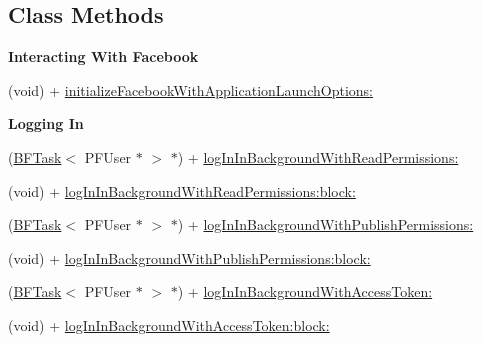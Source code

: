 \subsection*{Class Methods}
\begin{Indent}{\bf Interacting With Facebook}\par
{\em 

 

 }\begin{DoxyCompactItemize}
\item 
(void) + \hyperlink{interface_p_f_facebook_utils_a32d6e6e1b477fddad565d245431c8c01}{initialize\+Facebook\+With\+Application\+Launch\+Options\+:}
\end{DoxyCompactItemize}
\end{Indent}
\begin{Indent}{\bf Logging In}\par
{\em 

 

 }\begin{DoxyCompactItemize}
\item 
(\hyperlink{class_b_f_task}{B\+F\+Task}$<$ P\+F\+User $\ast$ $>$ $\ast$) + \hyperlink{interface_p_f_facebook_utils_a71ba8310cba3e92bde6050e624e56541}{log\+In\+In\+Background\+With\+Read\+Permissions\+:}
\item 
(void) + \hyperlink{interface_p_f_facebook_utils_a5a82664ca16f778e962aba8186db38ac}{log\+In\+In\+Background\+With\+Read\+Permissions\+:block\+:}
\item 
(\hyperlink{class_b_f_task}{B\+F\+Task}$<$ P\+F\+User $\ast$ $>$ $\ast$) + \hyperlink{interface_p_f_facebook_utils_a9b9ae0bcfc7c7503bbf8fa03aa7aae2a}{log\+In\+In\+Background\+With\+Publish\+Permissions\+:}
\item 
(void) + \hyperlink{interface_p_f_facebook_utils_a98a5e9449ef03ce40f0b38edf0f14a0e}{log\+In\+In\+Background\+With\+Publish\+Permissions\+:block\+:}
\item 
(\hyperlink{class_b_f_task}{B\+F\+Task}$<$ P\+F\+User $\ast$ $>$ $\ast$) + \hyperlink{interface_p_f_facebook_utils_a75c5a2dbe0acb7bfe8f620c55018d70e}{log\+In\+In\+Background\+With\+Access\+Token\+:}
\item 
(void) + \hyperlink{interface_p_f_facebook_utils_ace097bb75d6612fc02ea7fc74db47ed8}{log\+In\+In\+Background\+With\+Access\+Token\+:block\+:}
\end{DoxyCompactItemize}
\end{Indent}
